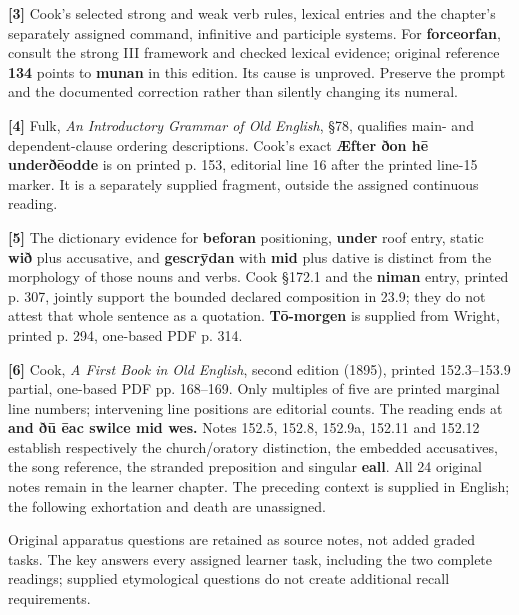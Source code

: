 \textbf{[3]} Cook’s selected strong and weak verb rules, lexical entries and the chapter’s separately assigned command, infinitive and participle systems. For \textbf{forceorfan}, consult the strong III framework and checked lexical evidence; original reference \textbf{134} points to \textbf{munan} in this edition. Its cause is unproved. Preserve the prompt and the documented correction rather than silently changing its numeral.

\textbf{[4]} Fulk, \emph{An Introductory Grammar of Old English}, §78, qualifies main- and dependent-clause ordering descriptions. Cook’s exact \textbf{Æfter ðon hē underðēodde} is on printed p. 153, editorial line 16 after the printed line-15 marker. It is a separately supplied fragment, outside the assigned continuous reading.

\textbf{[5]} The dictionary evidence for \textbf{beforan} positioning, \textbf{under} roof entry, static \textbf{wið} plus accusative, and \textbf{gescrȳdan} with \textbf{mid} plus dative is distinct from the morphology of those nouns and verbs. Cook §172.1 and the \textbf{niman} entry, printed p. 307, jointly support the bounded declared composition in 23.9; they do not attest that whole sentence as a quotation. \textbf{Tō-morgen} is supplied from Wright, printed p. 294, one-based PDF p. 314.

\textbf{[6]} Cook, \emph{A First Book in Old English}, second edition (1895), printed 152.3–153.9 partial, one-based PDF pp. 168–169. Only multiples of five are printed marginal line numbers; intervening line positions are editorial counts. The reading ends at \textbf{and ðū ēac swilce mid wes.} Notes 152.5, 152.8, 152.9a, 152.11 and 152.12 establish respectively the church/\allowbreak{}oratory distinction, the embedded accusatives, the song reference, the stranded preposition and singular \textbf{eall}. All 24 original notes remain in the learner chapter. The preceding context is supplied in English; the following exhortation and death are unassigned.

Original apparatus questions are retained as source notes, not added graded tasks. The key answers every assigned learner task, including the two complete readings; supplied etymological questions do not create additional recall requirements.

\endgroup


